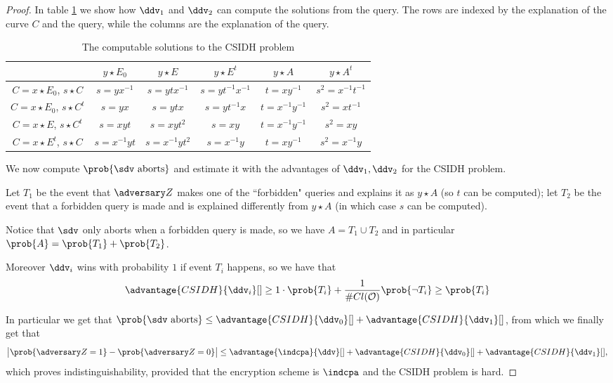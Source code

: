 \begin{proof}
    In table \ref{tab_dlogs} we show how $\ddv_1$ and $\ddv_2$ can compute the solutions from the query. The rows are indexed by the explanation of the curve $C$ and the query, while the columns are the explanation of the query.
    
    \begin{table}[]
        \centering
        \begin{tabular}{c|ccccc}
            & $y\star E_0$ & $y\star E$ & $y\star E^t$ & $y\star A$ & $y\star A^t$ \\
            \hline
            $C=x\star E_0$, $s\star C$ & $s=yx^{-1}$ & $s=ytx^{-1}$ & $s=yt^{-1}x^{-1}$ & $t=xy^{-1}$ & $s^2=x^{-1}t^{-1}$ \\ 
            $C=x\star E_0$, $s\star C^t$ & $s=yx$ & $s=ytx$ & $s=yt^{-1}x$ & $t=x^{-1}y^{-1}$ & $s^2=xt^{-1}$ \\
            $C=x\star E$, $s\star C^t$ & $s=xyt$ & $s=xyt^2$ & $s=xy$ & $t=x^{-1}y^{-1}$ & $s^2=xy$ \\
            $C=x\star E^t$, $s\star C$ & $s=x^{-1}yt$ & $s=x^{-1}yt^2$ & $s=x^{-1}y$ & $t=xy^{-1}$ & $s^2=x^{-1}y$ \\
        \end{tabular}
        \caption{The computable solutions to the CSIDH problem}
        \label{tab_dlogs}
    \end{table}
    
    We now compute $\prob{\sdv\text{ aborts}}$ and estimate it with the advantages of $\ddv_1,\ddv_2$ for the CSIDH problem.
    
    Let $T_1$ be the event that $\zdv$ makes one of the ``forbidden" queries and explains it as $y\star A$ (so $t$ can be computed); let $T_2$ be the event that a forbidden query is made and is explained differently from $y\star A$ (in which case $s$ can be computed).
    
    Notice that $\sdv$ only aborts when a forbidden query is made, so we have $A=T_1\cup T_2$ and in particular $\prob{A}=\prob{T_1}+\prob{T_2}$.
    
    Moreover $\ddv_i$ wins with probability $1$ if event $T_i$ happens, so we have that $$\advantage{CSIDH}{\ddv_i}[]\ge 1\cdot \prob{T_i} + \frac{1}{\# Cl(\Oc)}\prob{\neg T_i}\ge\prob{T_i}$$
    
    In particular we get that $\prob{\sdv\text{ aborts}} \le \advantage{CSIDH}{\ddv_0}[] + \advantage{CSIDH}{\ddv_1}[]$, from which we finally get that
    $$ \left|\prob{\zdv=1}-\prob{\zdv=0}\right| \le \advantage{\indcpa}{\ddv}[] + \advantage{CSIDH}{\ddv_0}[] + \advantage{CSIDH}{\ddv_1}[], $$
    which proves indistinguishability, provided that the encryption scheme is $\indcpa$ and the CSIDH problem is hard.
    
\end{proof}


